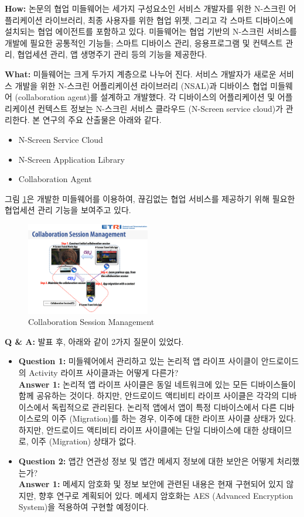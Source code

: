 \documentclass[twocolumn]{article}
\newcommand{\bi}{\begin{itemize}}
\newcommand{\ei}{\end{itemize}}
\newcommand{\ii}{\item}
\begin{document}
\noindent
\textbf{How:}  논문의 협업 미들웨어는 세가지 구성요소인 서비스 개발자를 위한 N-스크린 어플리케이션 라이브러리, 최종 사용자를 위한 협업 위젯, 그리고 각 스마트 디바이스에 설치되는 협업 에이전트를 포함하고 있다. 미들웨어는 협업 기반의 N-스크린 서비스를 개발에 필요한 공통적인 기능들; 스마트 디바이스 관리, 응용프로그램 및 컨텍스트 관리, 협업세션 관리, 앱 생명주기 관리 등의 기능을 제공한다.

\noindent
\textbf{What:} 미들웨어는 크게 두가지 계층으로 나누어 진다. 서비스 개발자가 새로운 서비스 개발을 위한 N-스크린 어플리케이션 라이브러리 (NSAL)과 디바이스 협업 미들웨어 (collaboration agent)를 설계하고 개발했다. 각 디바이스의 어플리케이션 및 어플리케이션 컨텍스트 정보는 N-스크린 서비스 클라우드 (N-Screen service cloud)가 관리한다. 본 연구의 주요 산출물은 아래와 같다.
\bi
\ii N-Screen Service Cloud
\ii N-Screen Application Library
\ii Collaboration Agent
\ei

그림 \ref{fig:session}은 개발한 미들웨어를 이용하여, 끊김없는 협업 서비스를 제공하기 위해 필요한 협업세션 관리 기능을 보여주고 있다.
\begin{figure}[htb]
        \centering
        \includegraphics[width=0.48\textwidth]{session.pdf}
        \caption{Collaboration Session Management}
        \label{fig:session}
\end{figure}

\noindent
\textbf{Q \& A:} 발표 후, 아래와 같이 2가지 질문이 있었다.
\bi
\ii \textbf{Question 1:} 미들웨어에서 관리하고 있는 논리적 앱 라이프 사이클이 안드로이드의 Activity 라이프 사이클과는 어떻게 다른가?\\
\textbf{Answer 1:} 논리적 앱 라이프 사이클은 동일 네트워크에 있는 모든 디바이스들이 함께 공유하는 것이다. 하지만, 안드로이드 액티비티 라이프 사이클은 각각의 디바이스에서 독립적으로 관리된다. 논리적 앱에서 앱이 특정 디바이스에서 다른 디바이스로의 이주 (Migration)를 하는 경우, 이주에 대한 라이프 사이클 상태가 있다. 하지만, 안드로이드 액티비티 라이프 사이클에는 단일 디바이스에 대한 상태이므로, 이주 (Migration) 상태가 없다.
\ii \textbf{Question 2:} 앱간 연관성 정보 및 앱간 메세지 정보에 대한 보안은 어떻게 처리했는가?\\
\textbf{Answer 1:} 메세지 암호화 및 정보 보안에 관련된 내용은 현재 구현되어 있지 않지만, 향후 연구로 계획되어 있다. 메세지 암호화는 AES (Advanced Encryption System)을 적용하여 구현할 예정이다.
\ei
\end{document}
